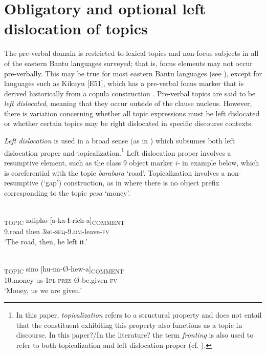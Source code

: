 \documentclass[output=paper]{langsci/langscibook}
\begin{document}
\section{Obligatory and optional left dislocation of topics}\label{§3:obligatory.nicolle}

The pre-verbal domain is restricted to lexical topics and non-focus subjects in all of the eastern Bantu languages surveyed; that is, focus elements may not occur pre-verbally. This may be true for most eastern Bantu languages (see \citealt{zerbian2006,vanderwal2009,yoneda2011}), except for languages such as Kikuyu [E51], which has a pre-verbal focus marker that is derived historically from a copula construction \citep{schwarz2003,schwarz2007,vanderwal2014}. Pre-verbal topics are said to be \textit{left dislocated}, meaning that they occur outside of the clause nucleus. However, there is variation concerning whether all topic expressions must be left dislocated or whether certain topics may be right dislocated in specific discourse contexts.

\textit{Left dislocation} is used in a broad sense (as in \citealt{shaeretal2009}) which subsumes both left dislocation proper and topicalization.\footnote{In this paper, \textit{topicalizat}\textit{ion} refers to a structural property and does not entail that the constituent exhibiting this property also functions as a topic in discourse. In this paper?/In the literature? the term \textit{fronting} is also used to refer to both topicalization and left dislocation proper (cf. \citealt[313]{cohen2009}).} Left dislocation proper involves a resumptive element, such as the class 9 object marker \textit{i}\textit{-} in example  below, which is coreferential with the topic \textit{barabara} ‘road’. Topicalization involves a non-resumptive (‘gap’) construction, as in  where there is no object prefix corresponding to the topic \textit{pesa} ‘money’.

\ea\label{ex:2.nicolle}
\\
\gll [Barabara]\textsubscript{TOPIC} ndipho [a-ka-\textbf{i}-rich-a]\textsubscript{COMMENT}\\
     {\db}9.road then {\db}\textsc{3sg-seq}-9.\textsc{om}-leave-\textsc{fv}\\
\glt ‘The road, then, he left it.’
\z

\ea\label{ex:3.nicolle}
\\
\gll [Pesa]\textsubscript{TOPIC} sino [hu-na-Ø-hew-a]\textsubscript{COMMENT}\\
{\db}10.money us {\db}\textsc{1pl-pres}-Ø-be.given-\textsc{fv}\\
\glt ‘Money, us we are given.’
\z
\end{document}
